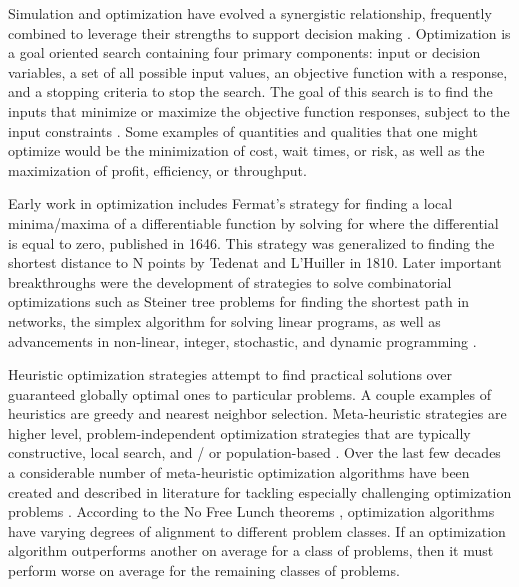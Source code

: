 \documentclass[a4paper]{article}
\begin{document}
Simulation and optimization have evolved a synergistic relationship, frequently combined to leverage their strengths to support decision making \cite{fu_handbook_2015}. Optimization is a goal oriented search containing four primary components: input or decision variables, a set of all possible input values, an objective function with a response, and a stopping criteria to stop the search. The goal of this search is to find the inputs that minimize or maximize the objective function responses, subject to the input constraints \cite{floudas_encyclopedia_2009}. Some examples of quantities and qualities that one might optimize would be the minimization of cost, wait times, or risk, as well as the maximization of profit, efficiency, or throughput.

Early work in optimization includes Fermat's strategy for finding a local minima/maxima of a differentiable function by solving for where the differential is equal to zero, published in 1646. This strategy was generalized to finding the shortest distance to N points by Tedenat and L'Huiller in 1810. Later important breakthroughs were the development of strategies to solve combinatorial optimizations such as Steiner tree problems for finding the shortest path in networks, the simplex algorithm for solving linear programs, as well as advancements in non-linear, integer, stochastic, and dynamic programming \cite{floudas_encyclopedia_2009}.

Heuristic optimization strategies attempt to find practical solutions over guaranteed globally optimal ones to particular problems. A couple examples of heuristics are greedy and nearest neighbor selection. Meta-heuristic strategies are higher level, problem-independent optimization strategies that are typically constructive, local search, and / or population-based \cite{marti_fifty_2025}. %
Over the last few decades a considerable number of meta-heuristic optimization algorithms have been created and described in literature for tackling especially challenging optimization problems \cite{ma_performance_2023}.
According to the No Free Lunch theorems \cite{wolpert_no_1997}, optimization algorithms have varying degrees of alignment to different problem classes. If an optimization algorithm outperforms another on average for a class of problems, then it must perform worse on average for the remaining classes of problems.
\end{document}
